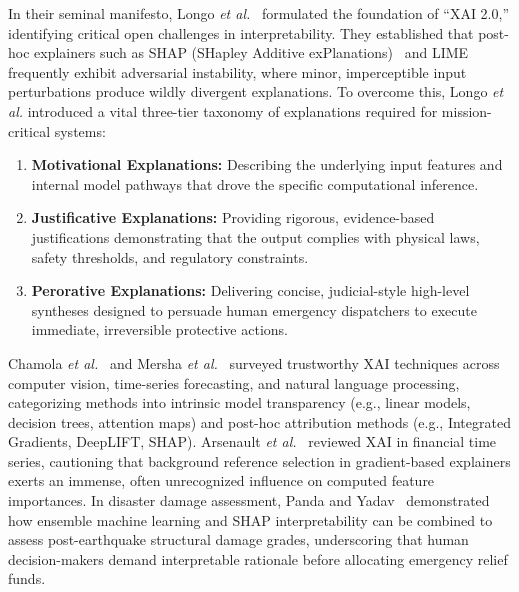 \documentclass[journal]{IEEEtran}
\begin{document}
In their seminal manifesto, Longo \textit{et al.}~\cite{longo2024explainable} formulated the foundation of ``XAI 2.0,'' identifying critical open challenges in interpretability. They established that post-hoc explainers such as SHAP (SHapley Additive exPlanations)~\cite{lundberg2017unified} and LIME frequently exhibit adversarial instability, where minor, imperceptible input perturbations produce wildly divergent explanations. To overcome this, Longo \textit{et al.} introduced a vital three-tier taxonomy of explanations required for mission-critical systems:
\begin{enumerate}
    \item \textbf{Motivational Explanations:} Describing the underlying input features and internal model pathways that drove the specific computational inference.
    \item \textbf{Justificative Explanations:} Providing rigorous, evidence-based justifications demonstrating that the output complies with physical laws, safety thresholds, and regulatory constraints.
    \item \textbf{Perorative Explanations:} Delivering concise, judicial-style high-level syntheses designed to persuade human emergency dispatchers to execute immediate, irreversible protective actions.
\end{enumerate}

Chamola \textit{et al.}~\cite{chamola2023review} and Mersha \textit{et al.}~\cite{mersha2024explainable} surveyed trustworthy XAI techniques across computer vision, time-series forecasting, and natural language processing, categorizing methods into intrinsic model transparency (e.g., linear models, decision trees, attention maps) and post-hoc attribution methods (e.g., Integrated Gradients, DeepLIFT, SHAP). Arsenault \textit{et al.}~\cite{arsenault2025survey} reviewed XAI in financial time series, cautioning that background reference selection in gradient-based explainers exerts an immense, often unrecognized influence on computed feature importances. In disaster damage assessment, Panda and Yadav~\cite{panda2025earthquake} demonstrated how ensemble machine learning and SHAP interpretability can be combined to assess post-earthquake structural damage grades, underscoring that human decision-makers demand interpretable rationale before allocating emergency relief funds.
\end{document}
